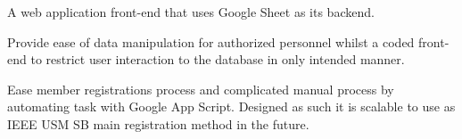 \documentclass[letterpaper]{deedy-resume} %
\begin{document}
\begin{minipage}[t]{0.66\textwidth}
\vspace{\topsep}
\begin{tightitemize}
\item A web application front-end that uses Google Sheet as its backend.
\item Provide ease of data manipulation for authorized personnel whilst a coded front-end to restrict user interaction to the database in only intended manner.
\item Ease member registrations process and complicated manual process by automating task with Google App Script. 
Designed as such it is scalable to use as IEEE USM SB main registration method in the future.
\end{tightitemize} 
\sectionspace %

\end{minipage} %


\newpage %
\end{document}
